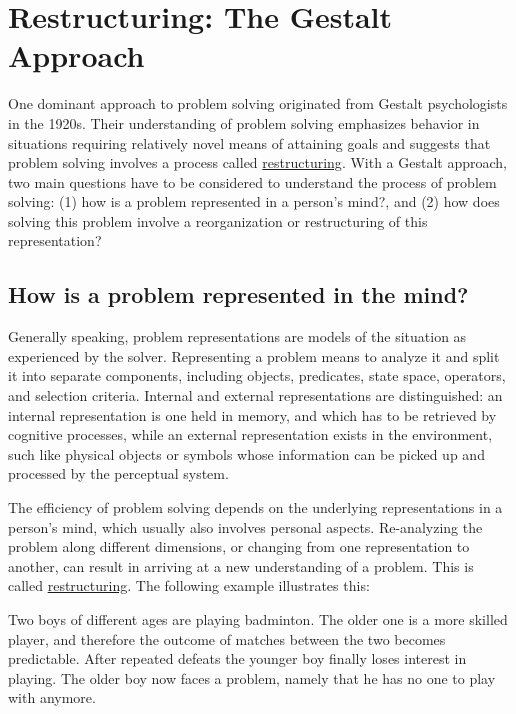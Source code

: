 \documentclass[
]{krantz}
\begin{document}
\section{Restructuring: The Gestalt Approach}\label{restructuring-the-gestalt-approach}

One dominant approach to problem solving originated from Gestalt psychologists in the 1920s. Their understanding of problem solving emphasizes behavior in situations requiring relatively novel means of attaining goals and suggests that problem solving involves a process called \hyperref[restructuring]{restructuring}. With a Gestalt approach, two main questions have to be considered to understand the process of problem solving: (1) how is a problem represented in a person's mind?, and (2) how does solving this problem involve a reorganization or restructuring of this representation?

\subsection*{How is a problem represented in the mind?}\label{how-is-a-problem-represented-in-the-mind}


Generally speaking, problem representations are models of the situation as experienced by the solver. Representing a problem means to analyze it and split it into separate components, including objects, predicates, state space, operators, and selection criteria. Internal and external representations are distinguished: an internal representation is one held in memory, and which has to be retrieved by cognitive processes, while an external representation exists in the environment, such like physical objects or symbols whose information can be picked up and processed by the perceptual system.

The efficiency of problem solving depends on the underlying representations in a person's mind, which usually also involves personal aspects. Re-analyzing the problem along different dimensions, or changing from one representation to another, can result in arriving at a new understanding of a problem. This is called \hyperref[restructuring]{restructuring}. The following example illustrates this:

Two boys of different ages are playing badminton. The older one is a more skilled player, and therefore the outcome of matches between the two becomes predictable. After repeated defeats the younger boy finally loses interest in playing. The older boy now faces a problem, namely that he has no one to play with anymore.
\end{document}
